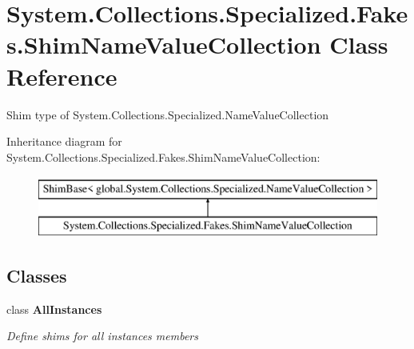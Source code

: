 \hypertarget{class_system_1_1_collections_1_1_specialized_1_1_fakes_1_1_shim_name_value_collection}{\section{System.\-Collections.\-Specialized.\-Fakes.\-Shim\-Name\-Value\-Collection Class Reference}
\label{class_system_1_1_collections_1_1_specialized_1_1_fakes_1_1_shim_name_value_collection}
}


Shim type of System.\-Collections.\-Specialized.\-Name\-Value\-Collection 


Inheritance diagram for System.\-Collections.\-Specialized.\-Fakes.\-Shim\-Name\-Value\-Collection\-:\begin{figure}[H]
\begin{center}
\leavevmode
\includegraphics[height=2.000000cm]{class_system_1_1_collections_1_1_specialized_1_1_fakes_1_1_shim_name_value_collection}
\end{center}
\end{figure}
\subsection*{Classes}
\begin{DoxyCompactItemize}
\item 
class {\bfseries All\-Instances}
\begin{DoxyCompactList}\small\item\em Define shims for all instances members\end{DoxyCompactList}\end{DoxyCompactItemize}
